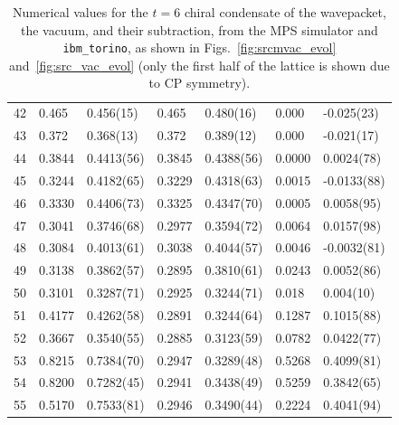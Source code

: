 \documentclass[aps, prc, tightenlines,superscriptaddress, letterpaper, amsmath, amssymb, preprintnumbers, floatfix, longbibliography, nofootinbib]{revtex4-2}
\begin{document}
\begin{table}[!htb]
{\begin{tabularx}{\textwidth}{| c || Y | Y | Y | Y | Y | Y |}
42	&	0.465	&	0.456(15)	&	0.465	&	0.480(16)	&	0.000	&	-0.025(23)	\\
43	&	0.372	&	0.368(13)	&	0.372	&	0.389(12)	&	0.000	&	-0.021(17)	\\
44	&	0.3844	&	0.4413(56)	&	0.3845	&	0.4388(56)	&	0.0000	&	0.0024(78)	\\
45	&	0.3244	&	0.4182(65)	&	0.3229	&	0.4318(63)	&	0.0015	&	-0.0133(88)	\\
46	&	0.3330	&	0.4406(73)	&	0.3325	&	0.4347(70)	&	0.0005	&	0.0058(95)	\\
47	&	0.3041	&	0.3746(68)	&	0.2977	&	0.3594(72)	&	0.0064	&	0.0157(98)	\\
48	&	0.3084	&	0.4013(61)	&	0.3038	&	0.4044(57)	&	0.0046	&	-0.0032(81)	\\
49	&	0.3138	&	0.3862(57)	&	0.2895	&	0.3810(61)	&	0.0243	&	0.0052(86)	\\
50	&	0.3101	&	0.3287(71)	&	0.2925	&	0.3244(71)	&	0.018	&	0.004(10)	\\
51	&	0.4177	&	0.4262(58)	&	0.2891	&	0.3244(64)	&	0.1287	&	0.1015(88)	\\
52	&	0.3667	&	0.3540(55)	&	0.2885	&	0.3123(59)	&	0.0782	&	0.0422(77)	\\
53	&	0.8215	&	0.7384(70)	&	0.2947	&	0.3289(48)	&	0.5268	&	0.4099(81)	\\
54	&	0.8200	&	0.7282(45)	&	0.2941	&	0.3438(49)	&	0.5259	&	0.3842(65)	\\
55	&	0.5170	&	0.7533(81)	&	0.2946	&	0.3490(44)	&	0.2224	&	0.4041(94)	\\ \hline
\end{tabularx}}
\caption{Numerical values for the $t=6$ chiral condensate of the wavepacket, the vacuum, and their subtraction, from the MPS simulator and {\tt ibm\_torino}, as shown in Figs.~\ref{fig:srcmvac_evol} and~\ref{fig:src_vac_evol} (only the first half of the lattice is shown due to CP symmetry).}
 \label{tab:tablet6}
\end{table}
%
\end{document}

